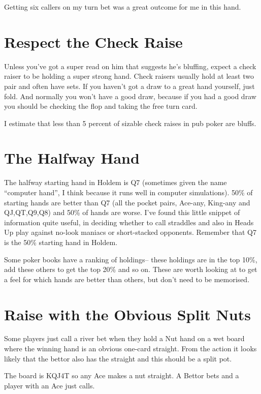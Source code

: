 Getting six callers on my turn bet was a great outcome for me in this hand.

\section{Respect the Check Raise}

Unless you've got a super read on him that suggests he's bluffing,
expect a check raiser to be holding a super strong hand. Check raisers
usually hold at least two pair and often have sets. If you haven't got
a draw to a great hand yourself, just fold. And normally you won't have
a good draw, because if you had a good draw you should be checking the
flop and taking the free turn card.

I estimate that less than 5 percent of sizable check raises in pub poker
are bluffs.

\section{The Halfway Hand}

The halfway starting hand in Holdem is Q7 (sometimes given the name
``computer hand'', I think because it runs well in computer simulations).
50\% of starting hands are better than Q7 (all the pocket pairs,
Ace-any, King-any and QJ,QT,Q9,Q8) and 50\% of hands are worse. I've
found this little snippet of information quite useful, in
deciding whether to call straddles and also in Heads Up play
against no-look maniacs or short-stacked opponents. Remember that Q7
is the 50\% starting hand in Holdem.

Some poker books have a ranking of holdings-- these holdings are in
the top 10\%, add these others to get the top 20\% and so on. These
are worth looking at to get a feel for which hands are better than
others, but don't need to be memorised.

\section{Raise with the Obvious Split Nuts}

Some players just call a river bet when they hold a Nut hand on a
wet board where the winning hand is an obvious
one-card straight. From the action it looks likely that the bettor
also has the straight and this should be a split pot.

The board is KQJ4T so any Ace makes a nut straight. A Bettor
bets and a player with an Ace just calls.

